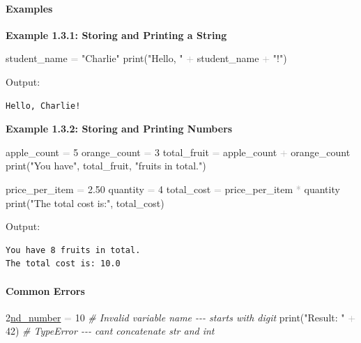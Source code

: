 \documentclass[
  justified,
  openright,
]{tufte-book}
\let\subsection\paragraph
\let\paragraph\paragraph
\newcommand{\StringTok}[1]{\textcolor{CodeString}{#1}}              %
\newcommand{\CommentTok}[1]{\textcolor{CodeComment}{\textit{#1}}}  %
\newcommand{\CodeNumTok}[1]{\textcolor{CodeNumber}{#1}}             %
\newcommand{\OperatorTok}[1]{\textcolor{DarkGray}{#1}}              %
\newcommand{\ErrorTok}[1]{\textcolor{CodeError}{\underline{#1}}}    %
\newenvironment{Shaded}{%
  \begin{mdframed}[style=TufteCode]%
}{%
  \end{mdframed}%
}
\let\subsection\paragraph
\let\paragraph\paragraph
\begin{document}
\subsection{Examples}\label{examples-1}

\textbf{Example 1.3.1: Storing and Printing a String}

\begin{Shaded}
\begin{Highlighting}[]
student\_name \OperatorTok{=} \StringTok{"Charlie"}
print(\StringTok{"Hello, "} \OperatorTok{+} student\_name \OperatorTok{+} \StringTok{"!"})
\end{Highlighting}
\end{Shaded}

Output:

\begin{verbatim}
Hello, Charlie!
\end{verbatim}

\textbf{Example 1.3.2: Storing and Printing Numbers}

\begin{Shaded}
\begin{Highlighting}[]
apple\_count \OperatorTok{=} \CodeNumTok{5}
orange\_count \OperatorTok{=} \CodeNumTok{3}
total\_fruit \OperatorTok{=} apple\_count \OperatorTok{+} orange\_count
print(\StringTok{"You have"}, total\_fruit, \StringTok{"fruits in total."})
 
price\_per\_item \OperatorTok{=} \CodeNumTok{2.50}
quantity \OperatorTok{=} \CodeNumTok{4}
total\_cost \OperatorTok{=} price\_per\_item \OperatorTok{*} quantity
print(\StringTok{"The total cost is:"}, total\_cost)
\end{Highlighting}
\end{Shaded}

Output:

\begin{verbatim}
You have 8 fruits in total.
The total cost is: 10.0
\end{verbatim}

\subsection{Common Errors}\label{common-errors}

\begin{Shaded}
\begin{Highlighting}[]
\CodeNumTok{2}\ErrorTok{nd\_number} \OperatorTok{=} \CodeNumTok{10}         \CommentTok{\# Invalid variable name {-}{-}{-} starts with digit}
print(\StringTok{"Result: "} \OperatorTok{+} \CodeNumTok{42})  \CommentTok{\# TypeError {-}{-}{-} can\textquotesingle{}t concatenate str and int}
\end{Highlighting}
\end{Shaded}
\end{document}
